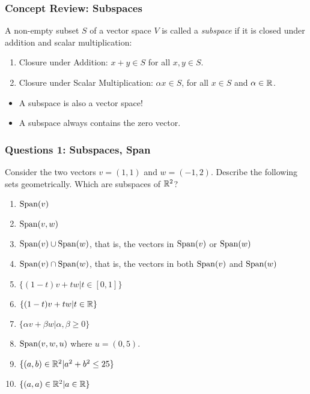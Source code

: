 \documentclass{beamer}
\begin{document}
\begin{frame}[t]
	\frametitle{Concept Review: Subspaces}
	\vspace{-0.3cm}
	\begin{definition}[Subspace]
		A non-empty subset $S$ of a vector space $V$ is called a \emph{subspace} if it is closed under addition and scalar multiplication:
		\begin{enumerate}
			\item Closure under Addition: $x+y \in S$  for all $x,y \in S$.
			\item Closure under Scalar Multiplication: $\alpha x \in S$, for all $x \in S$ and $\alpha \in \mathbb{R}$.
		\end{enumerate}
	\end{definition}
	\begin{itemize}
		\item A subspace is also a vector space!
		\item A subspace always contains the zero vector.
	\end{itemize}
\end{frame}

\begin{frame}[t]
	\frametitle{Questions 1: Subspaces, Span}
	Consider the two vectors $v=(1,1)$ and
	$w=(-1,2)$.  Describe the following sets geometrically.  Which are
	subspaces of $\mathbb{R}^2$?
	\begin{enumerate}
		\item ${{\rm Span}}(v)$
		\item ${{\rm Span}}(v,w)$
		\item ${{\rm Span}}(v)\cup{{\rm Span}}(w)$, that is, the vectors in ${{\rm Span}}(v)$ or
			${{\rm Span}}(w)$
		\item ${{\rm Span}}(v)\cap{{\rm Span}}(w)$, that is, the vectors in both ${{\rm Span}}(v)$ and
			${{\rm Span}}(w)$
			\pause
		\item $\{(1-t)v + tw | t\in[0,1]\}$
		\item $\{(1-t)v+tw | t\in\mathbb{R}\}$
		\item $\{\alpha v + \beta w | \alpha,\beta\geq 0\}$
		\item ${{\rm Span}}(v,w,u)$ where $u=(0,5)$.
		\item $\{(a,b)\in\mathbb{R}^2 | a^2+b^2\leq 25\}$
		\item $\{(a,a)\in\mathbb{R}^2 | a\in\mathbb{R}\}$
	\end{enumerate}
\end{frame}
\end{document}
